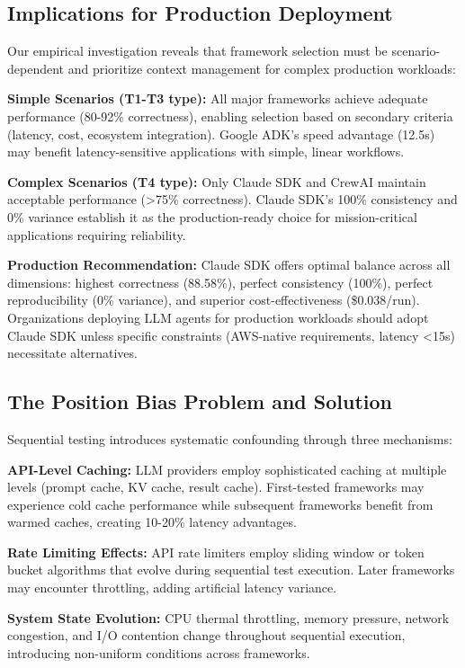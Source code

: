 \documentclass[sigconf,nonacm]{acmart}
\begin{document}
\subsection{Implications for Production Deployment}

Our empirical investigation reveals that framework selection must be scenario-dependent and prioritize context management for complex production workloads:

\textbf{Simple Scenarios (T1-T3 type):} All major frameworks achieve adequate performance (80-92\% correctness), enabling selection based on secondary criteria (latency, cost, ecosystem integration). Google ADK's speed advantage (12.5s) may benefit latency-sensitive applications with simple, linear workflows.

\textbf{Complex Scenarios (T4 type):} Only Claude SDK and CrewAI maintain acceptable performance (>75\% correctness). Claude SDK's 100\% consistency and 0\% variance establish it as the production-ready choice for mission-critical applications requiring reliability.

\textbf{Production Recommendation:} Claude SDK offers optimal balance across all dimensions: highest correctness (88.58\%), perfect consistency (100\%), perfect reproducibility (0\% variance), and superior cost-effectiveness (\$0.038/run). Organizations deploying LLM agents for production workloads should adopt Claude SDK unless specific constraints (AWS-native requirements, latency <15s) necessitate alternatives.

\subsection{The Position Bias Problem and Solution}

Sequential testing introduces systematic confounding through three mechanisms:

\textbf{API-Level Caching:} LLM providers employ sophisticated caching at multiple levels (prompt cache, KV cache, result cache). First-tested frameworks may experience cold cache performance while subsequent frameworks benefit from warmed caches, creating 10-20\% latency advantages.

\textbf{Rate Limiting Effects:} API rate limiters employ sliding window or token bucket algorithms that evolve during sequential test execution. Later frameworks may encounter throttling, adding artificial latency variance.

\textbf{System State Evolution:} CPU thermal throttling, memory pressure, network congestion, and I/O contention change throughout sequential execution, introducing non-uniform conditions across frameworks.
\end{document}
